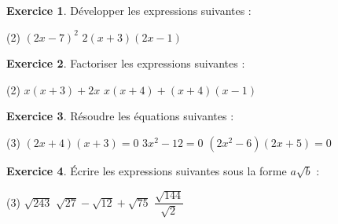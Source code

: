 \documentclass{exam}
\theoremstyle{definition}
\newtheorem{exercice}{Exercice}
\begin{document}
\large

% 

\vspace{2mm}


\vspace{2mm}

\begin{exercice}
Développer les expressions suivantes :
\begin{tasks}(2)
    \task $(2x - 7)^2$
    \task $2(x + 3)(2x - 1)$
\end{tasks}
\begin{center}
    \framebox[1\textwidth]{\parbox{5.5in}{%
    \vspace{11em}}}
\end{center}
\end{exercice}

\begin{exercice}
Factoriser les expressions suivantes :
\begin{tasks}(2)
    \task $x(x + 3) + 2x$
    \task $x(x + 4) + (x + 4)(x - 1)$
\end{tasks}
\begin{center}
    \framebox[1\textwidth]{\parbox{5.5in}{%
    \vspace{11em}}}
\end{center}
\end{exercice}

\begin{exercice}
Résoudre les équations suivantes :
\begin{tasks}(3)
    \task $(2x + 4)(x + 3) = 0$
    \task $3x^2 - 12 = 0$
    \task $(2x^2 - 6)(2x + 5) = 0$
\end{tasks}
\begin{center}
    \framebox[1\textwidth]{\parbox{5.5in}{%
    \vspace{20em}}}
\end{center}
\end{exercice}

\begin{exercice}
Écrire les expressions suivantes sous la forme $a\sqrt{b}$ :
\begin{tasks}(3)
    \task $\sqrt{243}$
    \task $\sqrt{27} - \sqrt{12} + \sqrt{75}$
    \task $\dfrac{\sqrt{144}}{\sqrt{2}}$
\end{tasks}
\begin{center}
    \framebox[1\textwidth]{\parbox{5.5in}{%
    \vspace{20em}}}
\end{center}
\end{exercice}
\end{document}
